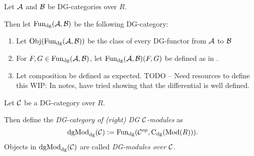 \begin{definition}[\( \Fun_{\dg}(\Ac, \Bc) \)]
    \label{def:dg_functor_category}
    Let \( {\mathcal{A}} \) and \( {\mathcal{B}} \) be DG-categories over \( R \).

    Then let \( \Fun_{\dg}(\Ac, \Bc) \) be the following DG-category:
    \begin{enumerate}
        \item{
            Let \( \operatorname{Obj}(\operatorname{Fun}_{\operatorname{dg}}({\mathcal{A}}, {\mathcal{B}})) \) be the class of every DG-functor from \( {\mathcal{A}} \) to \( {\mathcal{B}} \)
        }
        \item{
            For \( F, G \in \operatorname{Fun}_{\operatorname{dg}}({\mathcal{A}}, {\mathcal{B}}) \), let \( \operatorname{Fun}_{\operatorname{dg}}({\mathcal{A}}, {\mathcal{B}})(F, G) \) be defined as in \cite[Proposition 6.3.1]{Borceux_1994}.
        }
        \item {
            Let composition be defined as expected.
        }
        TODO -- Need resources to define this
        WIP: In notes, have tried showing that the differential is well defined.
    \end{enumerate}
\end{definition}

\begin{definition}[\( \dgMod_{\dg}(\Cc) \)]
    Let \( {\mathcal{C}} \) be a DG-category over \( R \).

    Then define the \emph{DG-category of (right) DG \( {\mathcal{C}} \)-modules} as
    \[
        \operatorname{dgMod}_{\operatorname{dg}}({\mathcal{C}}) := \operatorname{Fun}_{\operatorname{dg}}({\mathcal{C}}^{op}, \operatorname{C}_{\operatorname{dg}}(\operatorname{Mod}(R))).
    \]
    Objects in \( \dgMod_{\dg}(\Cc) \) are called \emph{DG-modules over \( {\mathcal{C}} \)}.
\end{definition}

